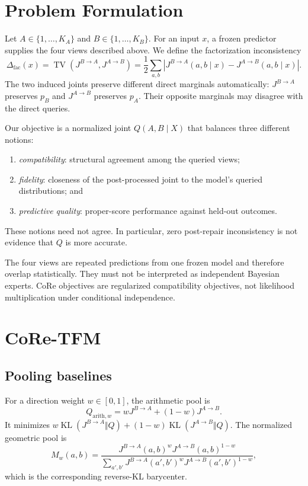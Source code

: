 \documentclass[a4paper,fleqn]{cas-sc}
\newcommand{\TV}{\operatorname{TV}}
\newcommand{\KL}{\operatorname{KL}}
\newcommand{\Jone}{J^{B\rightarrow A}}
\newcommand{\Jtwo}{J^{A\rightarrow B}}
\begin{document}
\section{Problem Formulation}
Let $A\in\{1,\ldots,K_A\}$ and $B\in\{1,\ldots,K_B\}$. For an input $x$, a frozen predictor supplies the four views described above. We define the factorization inconsistency
\begin{equation}
\Delta_{\mathrm{fac}}(x)=\TV\!\left(\Jone,\Jtwo\right)
=\frac{1}{2}\sum_{a,b}\left|\Jone(a,b\mid x)-\Jtwo(a,b\mid x)\right|.
\end{equation}
The two induced joints preserve different direct marginals automatically: $\Jone$ preserves $p_B$ and $\Jtwo$ preserves $p_A$. Their opposite marginals may disagree with the direct queries.

Our objective is a normalized joint $Q(A,B\mid X)$ that balances three different notions:
\begin{enumerate}
\item \emph{compatibility}: structural agreement among the queried views;
\item \emph{fidelity}: closeness of the post-processed joint to the model's queried distributions; and
\item \emph{predictive quality}: proper-score performance against held-out outcomes.
\end{enumerate}
These notions need not agree. In particular, zero post-repair inconsistency is not evidence that $Q$ is more accurate.

The four views are repeated predictions from one frozen model and therefore overlap statistically. They must not be interpreted as independent Bayesian experts. CoRe objectives are regularized compatibility objectives, not likelihood multiplication under conditional independence.

\section{CoRe-TFM}
\subsection{Pooling baselines}
For a direction weight $w\in[0,1]$, the arithmetic pool is
\begin{equation}
Q_{\mathrm{arith},w}=w\Jone+(1-w)\Jtwo.
\end{equation}
It minimizes $w\KL(\Jone\Vert Q)+(1-w)\KL(\Jtwo\Vert Q)$. The normalized geometric pool is
\begin{equation}
M_w(a,b)=\frac{\Jone(a,b)^w\Jtwo(a,b)^{1-w}}
{\sum_{a',b'}\Jone(a',b')^w\Jtwo(a',b')^{1-w}},
\end{equation}
which is the corresponding reverse-KL barycenter.
\end{document}
